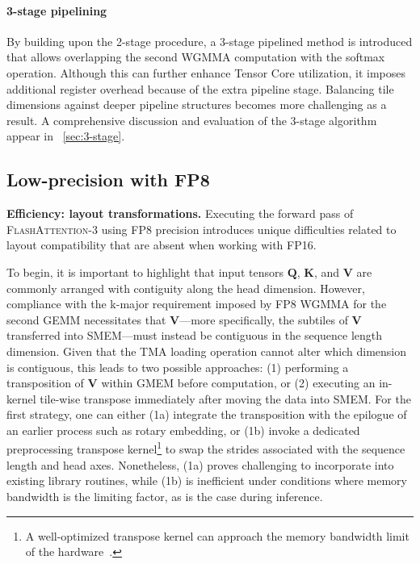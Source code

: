 \begin{enumerate}
\paragraph{3-stage pipelining} By building upon the 2-stage procedure, a 3-stage pipelined method is introduced that allows overlapping the second WGMMA computation with the softmax operation. Although this can further enhance Tensor Core utilization, it imposes additional register overhead because of the extra pipeline stage. Balancing tile dimensions against deeper pipeline structures becomes more challenging as a result. A comprehensive discussion and evaluation of the 3-stage algorithm appear in ~\cref{sec:3-stage}.

\subsection{Low-precision with FP8}
\label{sec:algofp8}

\textbf{Efficiency: layout transformations.} Executing the forward pass of \textsc{FlashAttention-3} using FP8 precision introduces unique difficulties related to layout compatibility that are absent when working with FP16.

To begin, it is important to highlight that input tensors $\mathbf{Q}$, $\mathbf{K}$, and $\mathbf{V}$ are commonly arranged with contiguity along the head dimension. However, compliance with the k-major requirement imposed by FP8 WGMMA for the second GEMM necessitates that $\mathbf{V}$—more specifically, the subtiles of $\mathbf{V}$ transferred into SMEM—must instead be contiguous in the sequence length dimension. Given that the TMA loading operation cannot alter which dimension is contiguous, this leads to two possible approaches: (1) performing a transposition of $\mathbf{V}$ within GMEM before computation, or (2) executing an in-kernel tile-wise transpose immediately after moving the data into SMEM. For the first strategy, one can either (1a) integrate the transposition with the epilogue of an earlier process such as rotary embedding, or (1b) invoke a dedicated preprocessing transpose kernel\footnote{A well-optimized transpose kernel can approach the memory bandwidth limit of the hardware~\citep{colfax_cutlass_transpose_2024}.} to swap the strides associated with the sequence length and head axes. Nonetheless, (1a) proves challenging to incorporate into existing library routines, while (1b) is inefficient under conditions where memory bandwidth is the limiting factor, as is the case during inference.


\end{enumerate}
